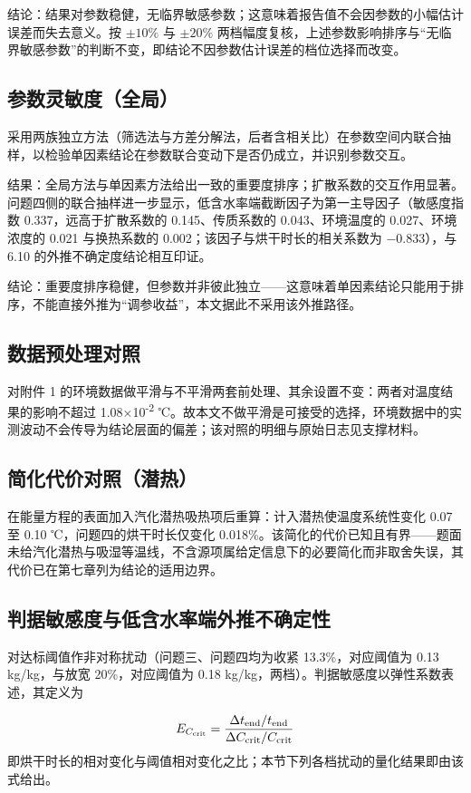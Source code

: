 结论：结果对参数稳健，无临界敏感参数；这意味着报告值不会因参数的小幅估计误差而失去意义。按 $\pm10\%$ 与 $\pm20\%$ 两档幅度复核，上述参数影响排序与“无临界敏感参数”的判断不变，即结论不因参数估计误差的档位选择而改变。

\subsection{参数灵敏度（全局）}
采用两族独立方法（筛选法与方差分解法，后者含相关比）在参数空间内联合抽样，以检验单因素结论在参数联合变动下是否仍成立，并识别参数交互。

结果：全局方法与单因素方法给出一致的重要度排序；扩散系数的交互作用显著。问题四侧的联合抽样进一步显示，低含水率端截断因子为第一主导因子（敏感度指数 0.337，远高于扩散系数的 0.145、传质系数的 0.043、环境温度的 0.027、环境浓度的 0.021 与换热系数的 0.002；该因子与烘干时长的相关系数为 −0.833），与 6.10 的外推不确定度结论相互印证。

结论：重要度排序稳健，但参数并非彼此独立——这意味着单因素结论只能用于排序，不能直接外推为“调参收益”，本文据此不采用该外推路径。

\subsection{数据预处理对照}
对附件 1 的环境数据做平滑与不平滑两套前处理、其余设置不变：两者对温度结果的影响不超过 1.08×10\textsuperscript{-2} ℃。故本文不做平滑是可接受的选择，环境数据中的实测波动不会传导为结论层面的偏差；该对照的明细与原始日志见支撑材料。

\subsection{简化代价对照（潜热）}
在能量方程的表面加入汽化潜热吸热项后重算：计入潜热使温度系统性变化 0.07 至 0.10 ℃，问题四的烘干时长仅变化 0.018\%。该简化的代价已知且有界——题面未给汽化潜热与吸湿等温线，不含源项属给定信息下的必要简化而非取舍失误，其代价已在第七章列为结论的适用边界。

\subsection{判据敏感度与低含水率端外推不确定性}
对达标阈值作非对称扰动（问题三、问题四均为收紧 13.3\%，对应阈值为 0.13 kg/kg，与放宽 20\%，对应阈值为 0.18 kg/kg，两档）。判据敏感度以弹性系数表述，其定义为

\begin{equation}
  E_{C_{\rm crit}}=\frac{\Delta t_{\rm end}/t_{\rm end}}{\Delta C_{\rm crit}/C_{\rm crit}}
  \label{eq:6-10}
\end{equation}
即烘干时长的相对变化与阈值相对变化之比；本节下列各档扰动的量化结果即由该式给出。

